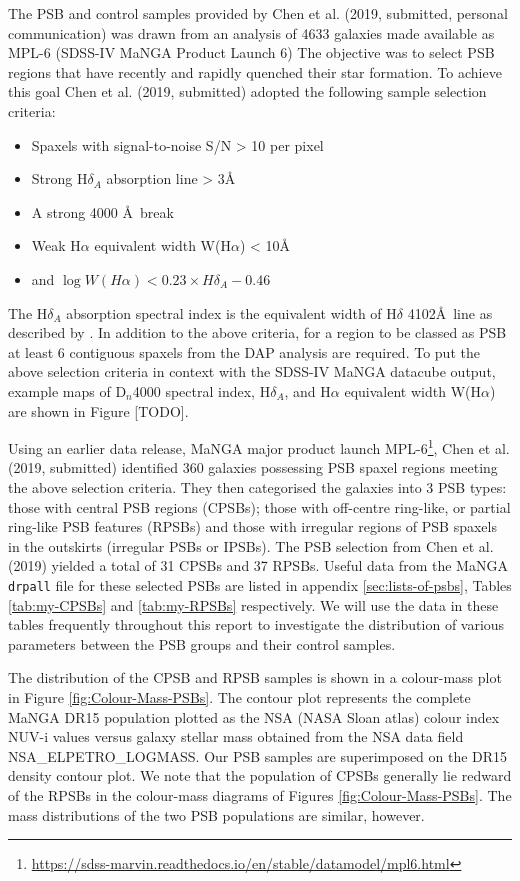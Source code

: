 The PSB and control samples provided by Chen et al. (2019, submitted, personal communication) was drawn from an analysis of 4633 galaxies made available as MPL-6 (SDSS-IV MaNGA Product Launch 6) The objective was to select PSB regions that have recently and rapidly quenched their star formation.  To achieve this goal Chen et al. (2019, submitted) adopted the following sample selection criteria:
\begin{itemize}
    \item Spaxels with signal-to-noise S/N > 10 per pixel
    \item Strong H$\delta_A$ absorption line > 3\AA 
    \item A strong 4000 \AA\ break 
    \item Weak H$\alpha$ equivalent width W(H$\alpha$) < 10\AA
    \item and $\log{W(H\alpha)} < 0.23\times{H\delta_A}-0.46$
\end{itemize}
The H$\delta_A$ absorption spectral index is the equivalent width of H$\delta$ 4102\AA\ line as described by \citet{1994ApJS...94..687W}. In addition to the above criteria, for a region to be classed as PSB at least 6 contiguous spaxels from the DAP analysis are required. To put the above selection criteria in context with the SDSS-IV MaNGA datacube output, example maps of D$_n$4000 spectral index, H$\delta_A$, and H$\alpha$ equivalent width W(H$\alpha$) are shown in Figure [TODO]. 

Using an earlier data release, MaNGA major product launch  MPL-6\footnote{\href{https://sdss-marvin.readthedocs.io/en/stable/datamodel/mpl6.html}{https://sdss-marvin.readthedocs.io/en/stable/datamodel/mpl6.html}}, Chen et al. (2019, submitted) identified 360 galaxies possessing PSB spaxel regions meeting the above selection criteria. They then categorised the galaxies into 3 PSB types: those with central PSB regions (CPSBs); those with off-centre ring-like, or partial ring-like PSB features (RPSBs) and those with irregular regions of PSB spaxels in the outskirts (irregular PSBs or IPSBs). The PSB selection from Chen et al. (2019) yielded a total of 31 CPSBs and 37 RPSBs. Useful data from the MaNGA \texttt{drpall} file for these selected PSBs are listed in appendix \ref{sec:lists-of-psbs}, Tables \ref{tab:my-CPSBs} and \ref{tab:my-RPSBs} respectively. We will use the data in these tables frequently throughout this report to investigate the distribution of various parameters between the PSB groups and their control samples.

The distribution of the CPSB and RPSB samples is shown in a colour-mass plot in Figure \ref{fig:Colour-Mass-PSBs}. The contour plot represents the complete MaNGA DR15 population plotted as the NSA (NASA Sloan atlas) colour index NUV-i values versus galaxy stellar mass obtained from the NSA data field  NSA\_ELPETRO\_LOGMASS. Our PSB samples are superimposed on the DR15 density contour plot. We note that the population of CPSBs generally lie redward of the RPSBs in the colour-mass diagrams of Figures \ref{fig:Colour-Mass-PSBs}. The mass distributions of the two PSB populations are similar, however.

